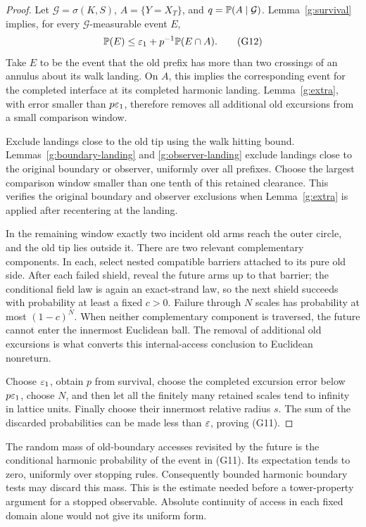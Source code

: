 \begin{proof}
Let \(\mathcal G=\sigma(K,S)\), \(A=\{Y=X_T\}\), and
\(q=\mathbb P(A\mid\mathcal G)\). Lemma~\ref{g:survival} implies,
for every \(\mathcal G\)-measurable event \(E\),
\[
 \mathbb P(E)\leq\varepsilon_1+p^{-1}\mathbb P(E\cap A).              \tag{G12}
\]
Take \(E\) to be the event that the old prefix has more than two
crossings of an annulus about its walk landing. On \(A\), this
implies the corresponding event for the completed interface at
its completed harmonic landing. Lemma~\ref{g:extra}, with error
smaller than \(p\varepsilon_1\), therefore removes all additional old
excursions from a small comparison window.

Exclude landings close to the old tip using the walk hitting bound.
Lemmas~\ref{g:boundary-landing} and \ref{g:observer-landing} exclude
landings close to the original boundary or observer, uniformly over
all prefixes. Choose the largest comparison window smaller than
one tenth of this retained clearance. This verifies the original
boundary and observer exclusions when Lemma~\ref{g:extra} is applied
after recentering at the landing.

In the remaining window exactly two incident old arms reach the
outer circle, and the old tip lies outside it. There are two
relevant complementary components. In each, select nested
compatible barriers attached to its pure old side. After each
failed shield, reveal the future arms up to that barrier; the
conditional field law is again an exact-strand law, so the next
shield succeeds with probability at least a fixed \(c>0\).
Failure through \(N\) scales has probability at most \((1-c)^N\).
When neither complementary component is traversed, the future
cannot enter the innermost Euclidean ball. The removal of
additional old excursions is what converts this internal-access
conclusion to Euclidean nonreturn.

Choose \(\varepsilon_1\), obtain \(p\) from survival, choose the completed
excursion error below \(p\varepsilon_1\), choose \(N\), and then let all
the finitely many retained scales tend to infinity in lattice
units. Finally choose their innermost relative radius \(s\).
The sum of the discarded probabilities can be made less than
\(\varepsilon\), proving (G11).
\end{proof}

\begin{remark}
The random mass of old-boundary accesses revisited by the future is
the conditional harmonic probability of the event in (G11).
Its expectation tends to zero, uniformly over stopping rules.
Consequently bounded harmonic boundary tests may discard this mass.
This is the estimate needed before a tower-property argument for a
stopped observable. Absolute continuity of access in each fixed domain
alone would not give its uniform form.
\end{remark}
